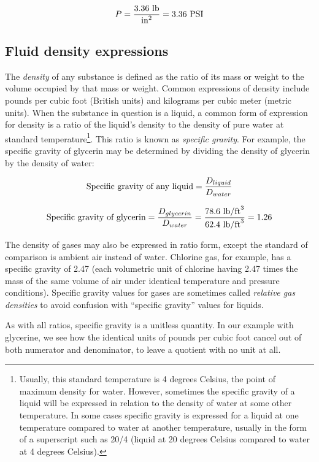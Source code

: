 $$P = {3.36 \hbox{ lb} \over \hbox{in}^2} = 3.36 \hbox{ PSI}$$




\filbreak
\subsection{Fluid density expressions}

The \textit{density} of any substance is defined as the ratio of its mass or weight to the volume occupied by that mass or weight.  Common expressions of density include pounds per cubic foot (British units) and kilograms per cubic meter (metric units).  When the substance in question is a liquid, a common form of expression for density is a ratio of the liquid's density to the density of pure water at standard temperature\footnote{Usually, this standard temperature is 4 degrees Celsius, the point of maximum density for water.  However, sometimes the specific gravity of a liquid will be expressed in relation to the density of water at some other temperature.  In some cases specific gravity is expressed for a liquid at one temperature compared to water at another temperature, usually in the form of a superscript such as 20/4 (liquid at 20 degrees Celsius compared to water at 4 degrees Celsius).}.  This ratio is known as \textit{specific gravity}.  For example, the specific gravity of glycerin may be determined by dividing the density of glycerin by the density of water:  

$$\hbox{Specific gravity of any liquid} = {D_{liquid} \over D_{water}}$$

$$\hbox{Specific gravity of glycerin} = {D_{glycerin} \over D_{water}} = { 78.6 \hbox{ lb/ft}^3 \over 62.4 \hbox{ lb/ft}^3} = 1.26 $$

The density of gases may also be expressed in ratio form, except the standard of comparison is ambient air instead of water.  Chlorine gas, for example, has a specific gravity of 2.47 (each volumetric unit of chlorine having 2.47 times the mass of the same volume of air under identical temperature and pressure conditions).  Specific gravity values for gases are sometimes called \textit{relative gas densities} to avoid confusion with ``specific gravity'' values for liquids.  

As with all ratios, specific gravity is a unitless quantity.  In our example with glycerine, we see how the identical units of pounds per cubic foot cancel out of both numerator and denominator, to leave a quotient with no unit at all.

